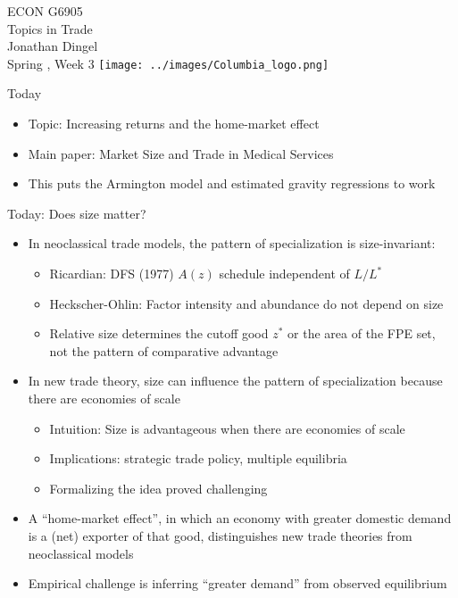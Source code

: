 \documentclass[11pt,notes=hide,aspectratio=169]{beamer}
\begin{document}
\begin{frame}[plain]
\begin{center}
\large
\textcolor{columbiadarkblue}{ECON G6905\\
Topics in Trade\\ 
Jonathan Dingel\\
Spring \the\year, Week 3}
\vfill 
\texttt{[image: ../images/Columbia\_logo.png]}
\end{center}
\end{frame}
\begin{frame}{Today}
\begin{itemize}
	\item Topic: Increasing returns and the home-market effect
	\item Main paper: Market Size and Trade in Medical Services
	\item This puts the Armington model and estimated gravity regressions to work 
\end{itemize}
\end{frame}
\begin{frame}{Today: Does size matter?}
\linespread{1.1}
\begin{itemize}
	\item In neoclassical trade models, the pattern of specialization is size-invariant:
	\begin{itemize}
		\item Ricardian: DFS (1977) $A(z)$ schedule independent of $L/L^{*}$
		\item Heckscher-Ohlin: Factor intensity and abundance do not depend on size 
		\item Relative size determines the cutoff good $z^{*}$ or the area of the FPE set, not the pattern of comparative advantage
	\end{itemize}
	\item In new trade theory, size can influence the pattern of specialization because there are economies of scale
\begin{itemize}
	\item Intuition: Size is advantageous when there are economies of scale
	\item Implications: strategic trade policy, multiple equilibria
	\item Formalizing the idea proved challenging
\end{itemize}
	\item A ``home-market effect'', in which an economy with greater domestic demand is a (net) exporter of that good, distinguishes new trade theories from neoclassical models
	\item Empirical challenge is inferring ``greater demand'' from observed equilibrium
\end{itemize}
\end{frame}
\end{document}
